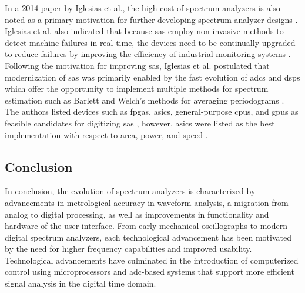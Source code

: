 \documentclass[class=report,11pt,crop=false]{standalone}
\begin{document}
In a 2014 paper by Iglesias et al., the high cost of spectrum analyzers is also noted as a primary motivation for further developing spectrum analyzer designs \cite{iglesias2014}. Iglesias et al. also indicated that because \acrshort{sa}s employ non-invasive methods to detect machine failures in real-time, the devices need to be continually upgraded to reduce failures by improving the efficiency of industrial monitoring systems \cite{iglesias2014}. Following the motivation for improving \acrshort{sa}s, Iglesias et al. postulated that modernization of \acrshort{sa}s was primarily enabled by the fast evolution of \acrshort{adc}s and \acrfull{dsp}s which offer the opportunity to implement multiple methods for spectrum estimation such as Barlett and Welch's methods for averaging periodograms \cite{iglesias2014}. The authors listed devices such as \acrfull{fpga}s, \acrfull{asic}s, general-purpose \acrshort{cpu}s, and \acrfull{gpu}s as feasible candidates for digitizing \acrshort{sa}s \cite{iglesias2014}, however, \acrshort{asic}s were listed as the best implementation with respect to area, power, and speed \cite{iglesias2014}. 
\subsection{Conclusion}

In conclusion, the evolution of spectrum analyzers is characterized by advancements in metrological accuracy in waveform analysis, a migration from analog to digital processing, as well as improvements in functionality and hardware of the user interface. From early mechanical oscillographs to modern digital spectrum analyzers, each technological advancement has been motivated by the need for higher frequency capabilities and improved usability. Technological advancements have culminated in the introduction of computerized control using microprocessors and \acrshort{adc}-based systems that support more efficient signal analysis in the digital time domain.
\end{document}
